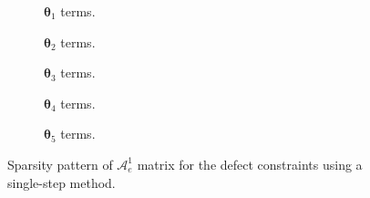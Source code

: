 \begin{figure}

\centering

\begin{subfigure}[b]{0.45\textwidth}

\vspace{-5mm}
\caption{$\bm{\theta}_1$ terms.}
\end{subfigure}
\begin{subfigure}[b]{0.45\textwidth}

\vspace{-5mm}
\caption{$\bm{\theta}_2$ terms.}
\end{subfigure}


\begin{subfigure}[b]{0.45\textwidth}

\vspace{-5mm}
\caption{$\bm{\theta}_3$ terms.}
\end{subfigure}
\begin{subfigure}[b]{0.45\textwidth}

\vspace{-5mm}
\caption{$\bm{\theta}_4$ terms.}
\end{subfigure}


\begin{subfigure}[b]{0.45\textwidth}

\vspace{-5mm}
\caption{$\bm{\theta}_5$ terms.}
\end{subfigure}

\caption{Sparsity pattern of $\bm{\mathcal{A}}_e^1$ matrix for the defect constraints using a single-step method.\label{fig:figsparsityASS}}
\end{figure}